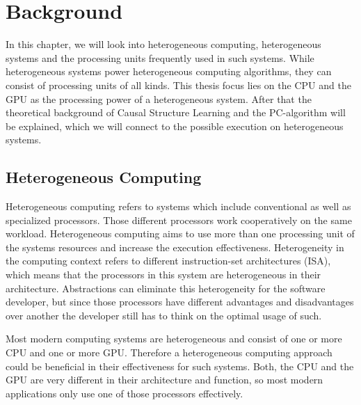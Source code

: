 \chapter{Background}
In this chapter, we will look into heterogeneous computing, heterogeneous systems and the processing units frequently used in such systems. While heterogeneous systems power heterogeneous computing algorithms, they can consist of processing units of all kinds. This thesis focus lies on the \acrfull{CPU} and the \acrfull{GPU} as the processing power of a heterogeneous system.
After that the theoretical background of Causal Structure Learning and the PC-algorithm will be explained, which we will connect to the possible execution on heterogeneous systems.

\section{Heterogeneous Computing}
Heterogeneous computing refers to systems which include conventional as well as specialized processors. Those different processors work cooperatively on the same workload. \cite{heterogprocessing} Heterogeneous computing aims to use more than one processing unit of the systems resources and increase the execution effectiveness. Heterogeneity in the computing context refers to different instruction-set architectures (ISA), which means that the processors in this system are heterogeneous in their architecture.
Abstractions can eliminate this heterogeneity for the software developer, but since those processors have different advantages and disadvantages over another the developer still has to think on the optimal usage of such.

Most modern computing systems are heterogeneous and consist of one or more \acrshort{CPU} and one or more \acrshort{GPU}. Therefore a heterogeneous computing approach could be beneficial in their effectiveness for such systems. Both, the \acrshort{CPU} and the \acrshort{GPU} are very different in their architecture and function, so most modern applications only use one of those processors effectively.


